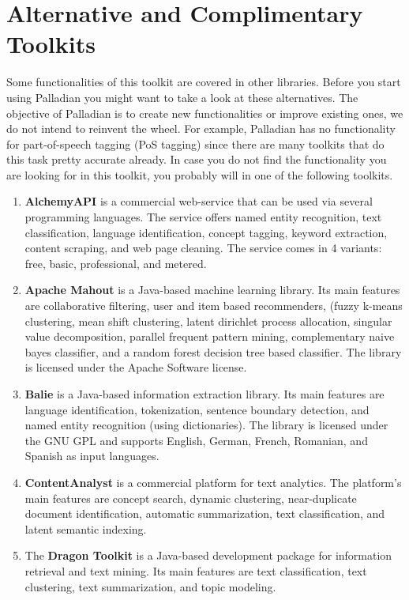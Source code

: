 \documentclass[a4paper,twoside]{book}      %
\begin{document}
\section{Alternative and Complimentary Toolkits}
Some functionalities of this toolkit are covered in other libraries. Before you start using Palladian you might want to take a look at these alternatives. The objective of Palladian is to create new functionalities or improve existing ones, we do not intend to reinvent the wheel. For example, Palladian has no functionality for part-of-speech tagging (PoS tagging) since there are many toolkits that do this task pretty accurate already. In case you do not find the functionality you are looking for in this toolkit, you probably will in one of the following toolkits.

\begin{enumerate}
\item \textbf{AlchemyAPI} \cite{alchemyapi} is a commercial web-service that can be used via several programming languages. The service offers named entity recognition, text classification, language identification, concept tagging, keyword extraction, content scraping, and web page cleaning.
The service comes in 4 variants: free, basic, professional, and metered.
\item \textbf{Apache Mahout} \cite{settings2apache} is a Java-based machine learning library. Its main features are collaborative filtering, user and item based recommenders, (fuzzy k-means clustering, mean shift clustering, latent dirichlet process allocation, singular value decomposition, parallel frequent pattern mining, complementary naive bayes classifier, and a random forest decision tree based classifier.
The library is licensed under the Apache Software license.
\item \textbf{Balie} \cite{balie} is a Java-based information extraction library. Its main features are language identification, tokenization, sentence boundary detection, and named entity recognition (using dictionaries).
The library is licensed under the GNU GPL and supports English, German, French, Romanian, and Spanish as input languages.
\item \textbf{ContentAnalyst} \cite{contentanalyst} is a commercial platform for text analytics. The platform's main features are concept search, dynamic clustering, near-duplicate document identification, automatic summarization, text classification, and latent semantic indexing.
\item The \textbf{Dragon Toolkit} \cite{zhou2007dragon} is a Java-based development package for information retrieval and text mining. Its main features are text classification, text clustering, text summarization, and topic modeling.

\end{enumerate}
\end{document}
